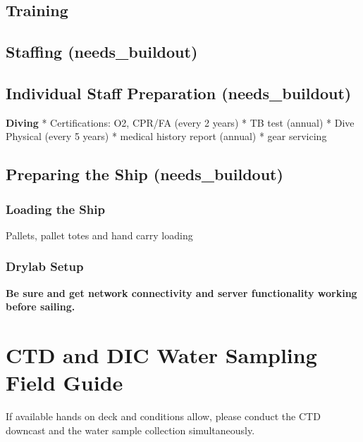 \documentclass[]{book}
\begin{document}
\hypertarget{training}{%
\section{Training}\label{training}}

\hypertarget{staffing-needs_buildout}{%
\section{Staffing (needs\_buildout)}\label{staffing-needs_buildout}}

\hypertarget{individual-staff-preparation-needs_buildout}{%
\section{Individual Staff Preparation (needs\_buildout)}\label{individual-staff-preparation-needs_buildout}}

\textbf{Diving}
* Certifications: O2, CPR/FA (every 2 years)
* TB test (annual)
* Dive Physical (every 5 years)
* medical history report (annual)
* gear servicing

\hypertarget{preparing-the-ship-needs_buildout}{%
\section{Preparing the Ship (needs\_buildout)}\label{preparing-the-ship-needs_buildout}}

\hypertarget{loading-the-ship}{%
\subsection{Loading the Ship}\label{loading-the-ship}}

Pallets, pallet totes and hand carry loading

\hypertarget{drylab-setup}{%
\subsection{Drylab Setup}\label{drylab-setup}}

\textbf{Be sure and get network connectivity and server functionality working before sailing.}

\hypertarget{water}{%
\chapter{CTD and DIC Water Sampling Field Guide}\label{water}}

If available hands on deck and conditions allow, please conduct the CTD downcast and the water sample collection simultaneously.
\end{document}
